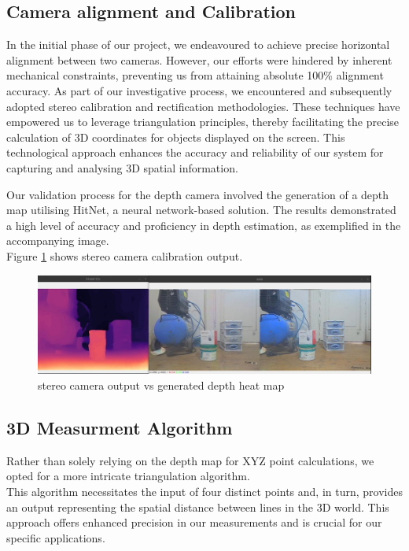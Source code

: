 \documentclass[journal]{IEEEtran}
\begin{document}
	\subsection{Camera alignment and Calibration}
	In the initial phase of our project, we endeavoured to achieve precise horizontal alignment between two cameras. However, our efforts were hindered by inherent mechanical constraints, preventing us from attaining absolute {100\%} alignment accuracy. As part of our investigative process, we encountered and subsequently adopted stereo calibration and rectification methodologies. These techniques have empowered us to leverage triangulation principles, thereby facilitating the precise calculation of 3D coordinates for objects displayed on the screen. This technological approach enhances the accuracy and reliability of our system for capturing and analysing 3D spatial information.
	
	Our validation process for the depth camera involved the generation of a depth map utilising HitNet, a neural network-based solution. The results demonstrated a high level of accuracy and proficiency in depth estimation, as exemplified in the accompanying image.\\
	
	Figure \ref{fig:stereo output} shows stereo camera calibration output.
	\begin{figure}[h]
	\centering
		\includegraphics[width=\linewidth]{stereo camera output vs generated depth heat map.png}
		\caption{stereo camera output vs generated depth heat map}
		\label{fig:stereo output}
	\end{figure}
	
	
	\subsection{3D Measurment Algorithm}
		Rather than solely relying on the depth map for XYZ point calculations, we opted for a more intricate triangulation algorithm.\\
		This algorithm necessitates the input of four distinct points and, in turn, provides an output representing the spatial distance between lines in the 3D world. This approach offers enhanced precision in our measurements and is crucial for our specific applications.\\
		
\end{document}
